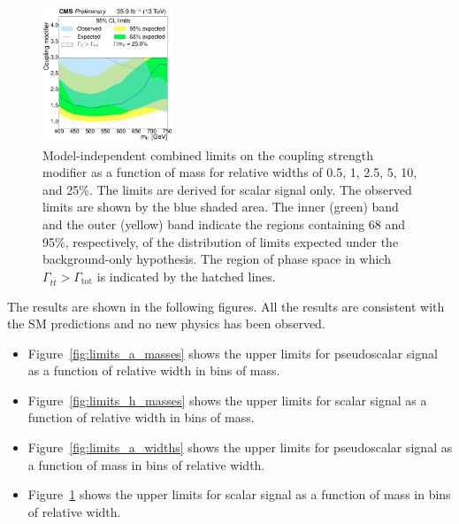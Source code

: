 \begin{figure}[!Hhtb]
\includegraphics[width=0.35\textwidth,keepaspectratio=true]{fig/chapt8/limits/limit_H_25.pdf}
\caption{Model-independent combined limits on the coupling strength modifier as a function of mass for relative widths of 0.5, 1, 2.5, 5, 10, and 25\%. The limits are derived for scalar signal only. The observed limits are shown by the blue shaded area. The inner (green) band and the outer (yellow) band indicate the regions containing 68 and 95\%, respectively, of the distribution of limits expected under the background-only hypothesis. The region of phase space in which $\Gamma_{t\bar t}>\Gamma_\mathrm{tot}$ is indicated by the hatched lines.}
\label{fig:limits_h_widths}
\end{figure}

The results are shown in the following figures. All the results are consistent with the SM predictions and no new physics has been observed.

\begin{itemize}
        \item Figure~\ref{fig:limits_a_masses} shows the upper limits for pseudoscalar signal as a function of relative width in bins of mass.
        \item Figure~\ref{fig:limits_h_masses} shows the upper limits for scalar signal as a function of relative width in bins of mass.
        \item Figure~\ref{fig:limits_a_widths} shows the upper limits for pseudoscalar signal as a function of mass in bins of relative width.
        \item Figure~\ref{fig:limits_h_widths} shows the upper limits for scalar signal as a function of mass in bins of relative width.
\end{itemize}



